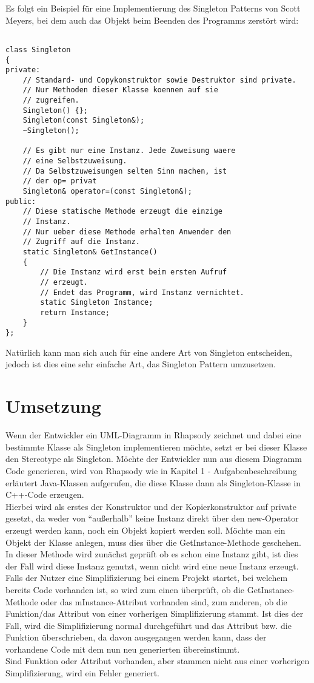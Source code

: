 Es folgt ein Beispiel für eine Implementierung des Singleton Patterns von Scott Meyers, bei dem auch das Objekt beim Beenden des Programms zerstört wird:
\begin{lstlisting}

class Singleton
{
private:
    // Standard- und Copykonstruktor sowie Destruktor sind private. 
    // Nur Methoden dieser Klasse koennen auf sie 
    // zugreifen.
    Singleton() {};
    Singleton(const Singleton&);
    ~Singleton();

    // Es gibt nur eine Instanz. Jede Zuweisung waere
    // eine Selbstzuweisung.
    // Da Selbstzuweisungen selten Sinn machen, ist
    // der op= privat
    Singleton& operator=(const Singleton&);
public:
    // Diese statische Methode erzeugt die einzige
    // Instanz.
    // Nur ueber diese Methode erhalten Anwender den 
    // Zugriff auf die Instanz.
    static Singleton& GetInstance() 
    {
        // Die Instanz wird erst beim ersten Aufruf
        // erzeugt.
        // Endet das Programm, wird Instanz vernichtet.
        static Singleton Instance;
        return Instance;
    }
};
\end{lstlisting}

Natürlich kann man sich auch für eine andere Art von Singleton entscheiden, jedoch ist dies eine sehr einfache Art, das Singleton Pattern umzusetzen.
\cite{singelton}\cite{singelton2}
\section{Umsetzung}

Wenn der Entwickler ein UML-Diagramm in Rhapsody zeichnet und dabei eine bestimmte Klasse als Singleton implementieren möchte, setzt er bei dieser Klasse den Stereotype als Singleton. Möchte der Entwickler nun aus diesem Diagramm Code generieren, wird von Rhapsody wie in Kapitel 1 - Aufgabenbeschreibung erläutert Java-Klassen aufgerufen, die diese Klasse dann als Singleton-Klasse in C++-Code erzeugen. 
\\
Hierbei wird als erstes der Konstruktor und der Kopierkonstruktor auf private gesetzt, da weder von \enquote{außerhalb} keine Instanz direkt über den new-Operator erzeugt werden kann, noch ein Objekt kopiert werden soll. Möchte man ein Objekt der Klasse anlegen, muss dies über die GetInstance-Methode geschehen. In dieser Methode wird zunächst geprüft ob es schon eine Instanz gibt, ist dies der Fall wird diese Instanz genutzt, wenn nicht wird eine neue Instanz erzeugt.\\


Falls der Nutzer eine Simplifizierung bei einem Projekt startet, bei welchem
bereits Code vorhanden ist, so wird zum einen überprüft, ob die
GetInstance-Methode oder das mInstance-Attribut vorhanden sind, zum anderen, ob
die Funktion/das Attribut von einer vorherigen Simplifizierung stammt. Ist dies
der Fall, wird die Simplifizierung normal durchgeführt und das Attribut bzw. die
Funktion überschrieben, da davon ausgegangen werden kann, dass der vorhandene
Code mit dem nun neu generierten übereinstimmt. \\
Sind Funktion oder Attribut vorhanden, aber stammen nicht aus einer vorherigen
Simplifizierung, wird ein Fehler generiert.
